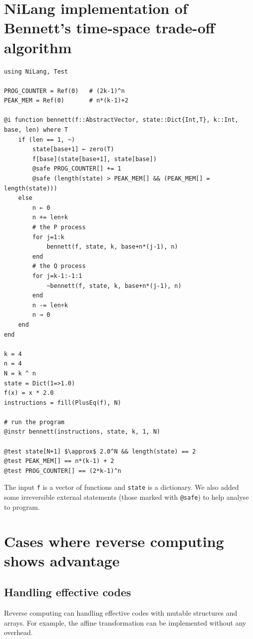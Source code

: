 \documentclass{article}
\newcommand{\<}{\langle}
\renewcommand{\>}{\rangle}
\theoremstyle{definition}\newtheorem{definition}{\textit{Definition}}
\begin{document}
\section{NiLang implementation of Bennett's time-space trade-off algorithm}\label{app:bennett-nilang}
\begin{minipage}{.88\columnwidth}
    \begin{lstlisting}[mathescape=true,caption={NiLang implementation of the Bennett's time-space trade-off scheme.},label={lst:bennett-nilang}]
using NiLang, Test

PROG_COUNTER = Ref(0)   # (2k-1)^n
PEAK_MEM = Ref(0)       # n*(k-1)+2

@i function bennett(f::AbstractVector, state::Dict{Int,T}, k::Int, base, len) where T
    if (len == 1, ~)
        state[base+1] ← zero(T)
        f[base](state[base+1], state[base])
        @safe PROG_COUNTER[] += 1
        @safe (length(state) > PEAK_MEM[] && (PEAK_MEM[] = length(state)))
    else
        n ← 0
        n += len÷k
        # the P process
        for j=1:k
            bennett(f, state, k, base+n*(j-1), n)
        end
        # the Q process
        for j=k-1:-1:1
            ~bennett(f, state, k, base+n*(j-1), n)
        end
        n -= len÷k
        n → 0
    end
end

k = 4
n = 4
N = k ^ n
state = Dict(1=>1.0)
f(x) = x * 2.0
instructions = fill(PlusEq(f), N)

# run the program
@instr bennett(instructions, state, k, 1, N)

@test state[N+1] $\approx$ 2.0^N && length(state) == 2
@test PEAK_MEM[] == n*(k-1) + 2
@test PROG_COUNTER[] == (2*k-1)^n
\end{lstlisting}
\end{minipage}

The input \texttt{f} is a vector of functions and \texttt{state} is a dictionary.
We also added some irreversible external statements (those marked with \texttt{@safe}) to help analyse to program.

\section{Cases where reverse computing shows advantage}\label{app:rev-advantages}
\subsection{Handling effective codes}\label{app:effectivecode}
Reverse computing can handling effective codes with mutable structures and arrays.
For example, the affine transformation can be implemented without any overhead.
\end{document}
